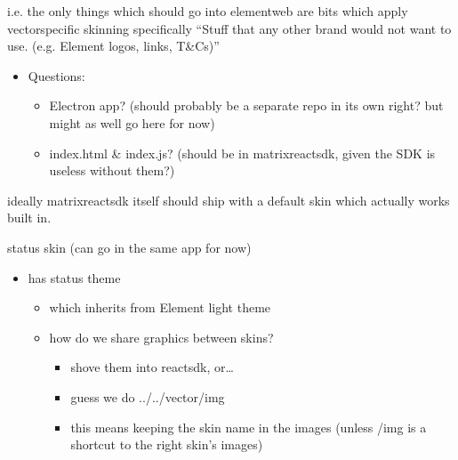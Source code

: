 \documentclass[letterpaper,10pt,openany,oneside,english]{sphinxmanual}
\begin{document}
\sphinxAtStartPar
i.e. the only things which should go into element\sphinxhyphen{}web are bits which apply vector\sphinxhyphen{}specific skinning
specifically “Stuff that any other brand would not want to use. (e.g. Element logos, links, T\&Cs)”
\begin{itemize}
\item {} 
\sphinxAtStartPar
Questions:
\begin{itemize}
\item {} 
\sphinxAtStartPar
Electron app?  (should probably be a separate repo in its own right?  but might as well go here for now)

\item {} 
\sphinxAtStartPar
index.html \& index.js?  (should be in matrix\sphinxhyphen{}react\sphinxhyphen{}sdk, given the SDK is useless without them?)

\end{itemize}

\end{itemize}

\sphinxAtStartPar
ideally matrix\sphinxhyphen{}react\sphinxhyphen{}sdk itself should ship with a default skin which actually works built in.

\sphinxAtStartPar
status skin (can go in the same app for now)
\begin{itemize}
\item {} 
\sphinxAtStartPar
has status theme
\begin{itemize}
\item {} 
\sphinxAtStartPar
which inherits from Element light theme

\item {} 
\sphinxAtStartPar
how do we share graphics between skins?
\begin{itemize}
\item {} 
\sphinxAtStartPar
shove them into react\sphinxhyphen{}sdk, or…

\item {} 
\sphinxAtStartPar
guess we do ../../vector/img

\item {} 
\sphinxAtStartPar
this means keeping the skin name in the images (unless /img is a shortcut to the right skin’s images)

\end{itemize}

\end{itemize}

\end{itemize}
\end{document}
